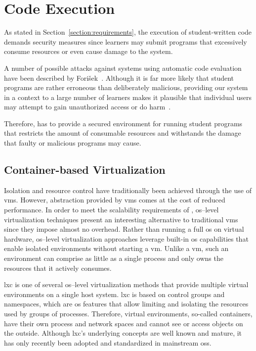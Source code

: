 \section{Code Execution}\label{section:code-execution1}

As stated in Section~\ref{section:requirements}, the execution of student-written code demands security measures since learners may submit programs that excessively consume resources or even cause damage to the system.

A number of possible attacks against systems using automatic code evaluation have been described by Fori\v{s}ek~\cite{forivsek2006security}. Although it is far more likely that student programs are rather erroneous than deliberately malicious, providing our system in a \mooc context to a large number of learners makes it plausible that individual users may attempt to gain unauthorized access or do harm~\cite{pieterse2013automated}.

Therefore, \tool has to provide a secured environment for running student programs that restricts the amount of consumable resources and withstands the damage that faulty or malicious programs may cause.

\subsection{Container-based Virtualization}

Isolation and resource control have traditionally been achieved through the use of \glspl{vm}. However, abstraction provided by \glspl{vm} comes at the cost of reduced performance. In order to meet the scalability requirements of \moocs, \gls{os}--level virtualization techniques present an interesting alternative to traditional \glspl{vm} since they impose almost no overhead. Rather than running a full \gls{os} on virtual hardware, \gls{os}--level virtualization approaches leverage built-in \gls{os} capabilities that enable isolated environments without starting a \gls{vm}. Unlike a \gls{vm}, such an environment can comprise as little as a single process and only owns the resources that it actively consumes.

\Gls{lxc} is one of several \gls{os}--level virtualization methods that provide multiple virtual environments on a single host system. \Gls{lxc} is based on control groups and namespaces, which are \gls{os} features that allow limiting and isolating the resources used by groups of processes. Therefore, virtual environments, so-called containers, have their own process and network spaces and cannot see or access objects on the outside. Although \gls{lxc}'s underlying concepts are well known and mature, it has only recently been adopted and standardized in mainstream \glspl{os}.

